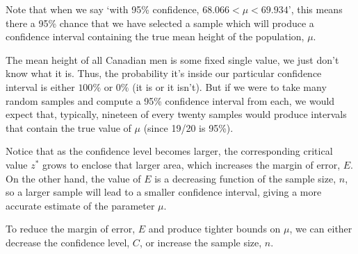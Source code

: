 \par
Note that when we say `with 95\% confidence, $68.066 < \mu < 69.934$', this means there a 95\% chance that we have selected a sample which will produce a confidence interval containing the true mean height of the population, $\mu$.
\par
The mean height of all Canadian men is some fixed single value, we just don't know what it is. Thus, the probability it's inside our particular confidence interval is either $100\%$ or $0\%$ (it is or it isn't). But if we were to take many random samples and compute a 95\% confidence interval from each, we would expect that, typically, nineteen of every twenty samples would produce intervals that contain the true value of $\mu$ (since 19/20 is 95\%).
\begin{center}
\end{center}
\par
Notice that as the confidence level becomes larger, the corresponding critical value $z^*$ grows to enclose that larger area, which increases the margin of error, $E$. On the other hand, the value of $E$ is a decreasing function of the sample size, $n$, so a larger sample will lead to a smaller confidence interval, giving a more accurate estimate of the parameter $\mu$.
\begin{prop} To reduce the margin of error, $E$ and produce tighter bounds on $\mu$, we can either decrease the confidence level, $C$, or increase the sample size, $n$.
\end{prop}

